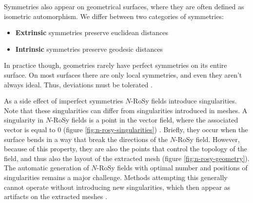 \documentclass{ACGSeminar}
\begin{document}
Symmetries also appear on geometrical surfaces, where they are often defined as isometric automorphism. We differ between two categories of symmetries:
\begin{itemize}
	\item	\textbf{Extrinsic} symmetries preserve euclidean distances
	\item	\textbf{Intrinsic} symmetries preserve geodesic distances
\end{itemize}
In practice though, geometries rarely have perfect symmetries on its entire surface. On most surfaces there are only local symmetries, and even they aren't always ideal. Thus, deviations must be tolerated \cite{panozzo2012fields}.\bigskip

As a side effect of imperfect symmetries $N$-RoSy fields introduce singularities. Note that these singularities can differ from singularities introduced in meshes. A singularity in $N$-RoSy fields is a point in the vector field, where the associated vector is equal to 0 (figure \ref{fig:n-rosy-singularities}) \cite{palacios2007rotational}. Briefly, they occur when the surface bends in a way that break the directions of the $N$-RoSy field. However, because of this property, they are also the points that control the topology of the field, and thus also the layout of the extracted mesh (figure \ref{fig:n-rosy-geometry}). The automatic generation of $N$-RoSy fields with optimal number and positions of singularities remains a major challenge. Methods attempting this generally cannot operate without introducing new singularities, which then appear as artifacts on the extracted meshes \cite{lai2009metric}.
\end{document}
